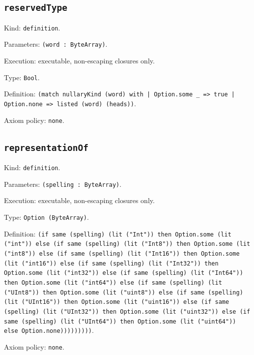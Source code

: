 \documentclass[11pt]{article}
\begin{document}
\subsection*{\texttt{reservedType}}
\noindent Kind: \texttt{definition}.\par
\noindent Parameters: \texttt{(word : ByteArray)}.\par
\noindent Execution: executable, non-escaping closures only.\par
\noindent Type: \texttt{Bool}.\par
\noindent Definition: \texttt{(match nullaryKind (word) with | Option.some \_ => true | Option.none => listed (word) (heads))}.\par
\noindent Axiom policy: \texttt{none}.\par
\subsection*{\texttt{representationOf}}
\noindent Kind: \texttt{definition}.\par
\noindent Parameters: \texttt{(spelling : ByteArray)}.\par
\noindent Execution: executable, non-escaping closures only.\par
\noindent Type: \texttt{Option (ByteArray)}.\par
\noindent Definition: \texttt{(if same (spelling) (lit ("Int")) then Option.some (lit ("int")) else (if same (spelling) (lit ("Int8")) then Option.some (lit ("int8")) else (if same (spelling) (lit ("Int16")) then Option.some (lit ("int16")) else (if same (spelling) (lit ("Int32")) then Option.some (lit ("int32")) else (if same (spelling) (lit ("Int64")) then Option.some (lit ("int64")) else (if same (spelling) (lit ("UInt8")) then Option.some (lit ("uint8")) else (if same (spelling) (lit ("UInt16")) then Option.some (lit ("uint16")) else (if same (spelling) (lit ("UInt32")) then Option.some (lit ("uint32")) else (if same (spelling) (lit ("UInt64")) then Option.some (lit ("uint64")) else Option.none)))))))))}.\par
\noindent Axiom policy: \texttt{none}.\par
\end{document}
